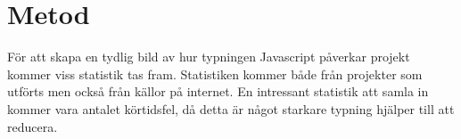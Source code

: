 \section{Metod}
\label{sec:alexander-method}

För att skapa en tydlig bild av hur typningen Javascript påverkar projekt kommer viss statistik tas fram. Statistiken kommer både från projekter som utförts men också från källor på internet. En intressant statistik att samla in kommer vara antalet körtidsfel, då detta är något starkare typning hjälper till att reducera.